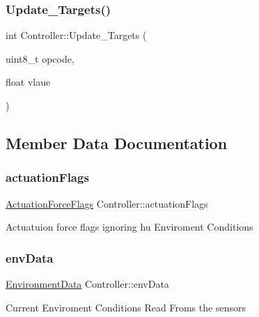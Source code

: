 \mbox{\label{classController_a0eb08a1d38b2c79e2d140476fd097f24}} 
\subsubsection{\texorpdfstring{Update\+\_\+\+Targets()}{Update\_Targets()}}
{\footnotesize\ttfamily int Controller\+::\+Update\+\_\+\+Targets (\begin{DoxyParamCaption}\item[{uint8\+\_\+t}]{opcode,  }\item[{float}]{vlaue }\end{DoxyParamCaption})}



\subsection{Member Data Documentation}
\mbox{\label{classController_adb38d16eaea1f98887b3c1fc75ab5bd3}} 
\subsubsection{\texorpdfstring{actuation\+Flags}{actuationFlags}}
{\footnotesize\ttfamily \hyperlink{structActuationForceFlags}{Actuation\+Force\+Flags} Controller\+::actuation\+Flags}

Actuatuion force flags ignoring hu Enviroment Conditions \mbox{\label{classController_ac99088334f56588243867ca1c18f9633}} 
\subsubsection{\texorpdfstring{env\+Data}{envData}}
{\footnotesize\ttfamily \hyperlink{structEnvironmentData}{Environment\+Data} Controller\+::env\+Data}

Current Enviroment Conditions Read Froms the sensors \mbox{\label{classController_aa3f1d7aae706a5440adf520cbd7fb216}} 
